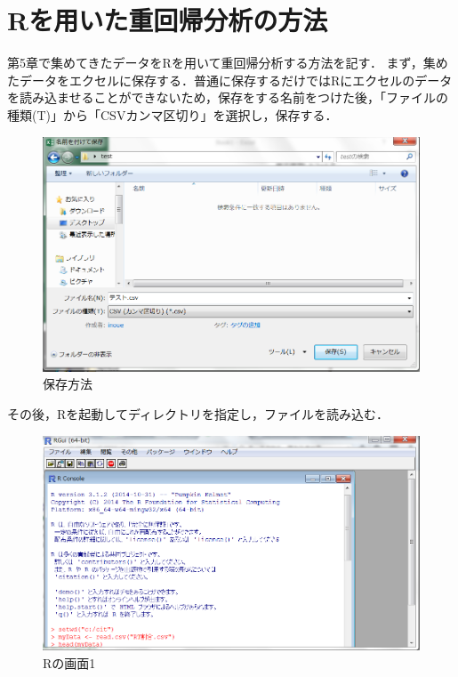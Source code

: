 \section{Rを用いた重回帰分析の方法}
第5章で集めてきたデータをRを用いて重回帰分析する方法を記す．
まず，集めたデータをエクセルに保存する．普通に保存するだけではRにエクセルのデータを読み込ませることができないため，保存をする名前をつけた後，「ファイルの種類(T)」から「CSVカンマ区切り」を選択し，保存する．

\begin{figure}[H]
\centering
\includegraphics[width=15cm]{kekka001.png}
\caption{保存方法}\label{エクセルの保存方法}
\end{figure}

その後，Rを起動してディレクトリを指定し，ファイルを読み込む．

\begin{figure}[H]
\centering
\includegraphics[width=15cm]{kekka002.png}
\caption{Rの画面1}\label{Rの画面1}
\end{figure}

